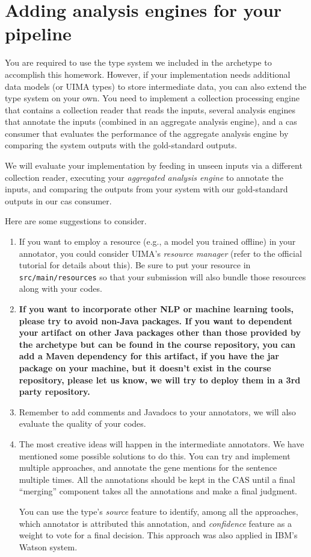 
\section{Adding analysis engines for your pipeline}

You are required to use the type system we included in the archetype to
accomplish this homework. However, if your implementation needs additional data
models (or UIMA types) to store intermediate data, you can also extend the type
system on your own. You need to implement a collection processing engine that
contains a collection reader that reads the inputs, several analysis engines
that annotate the inputs (combined in an aggregate analysis engine), and a cas
consumer that evaluates the performance of the aggregate analysis engine by
comparing the system outputs with the gold-standard outputs.

We will evaluate your implementation by feeding in unseen inputs via a different
collection reader, executing your \emph{aggregated analysis engine} to annotate
the inputs, and comparing the outputs from your system with our gold-standard
outputs in our cas consumer.

Here are some suggestions to consider.

\begin{enumerate}

\item If you want to employ a resource (e.g., a model you trained offline) in
your annotator, you could consider UIMA's \emph{resource manager} (refer to the
official tutorial for details about this).
Be sure to put your resource in \texttt{src/main/resources} so that your
submission will also bundle those resources along with your codes.

\item \textbf{If you want to incorporate other NLP or machine learning tools,
please try to avoid non-Java packages. If you want to dependent your artifact on
other Java packages other than those provided by the archetype but can be found
in the course repository, you can add a Maven dependency for this artifact, if
you have the jar package on your machine, but it doesn't exist in the course
repository, please let us know, we will try to deploy them in a 3rd party
repository.}

\item Remember to add comments and Javadocs to your annotators, we will also
evaluate the quality of your codes.

\item The most creative ideas will happen in the intermediate annotators. We
have mentioned some possible solutions to do this. You can try and implement
multiple approaches, and annotate the gene mentions for the sentence multiple
times. All the annotations should be kept in the CAS until a final ``merging''
component takes all the annotations and make a final judgment.

You can use the type's \emph{source} feature to identify, among all the
approaches, which annotator is attributed this annotation, and \emph{confidence}
feature as a weight to vote for a final decision. This approach was also applied
in IBM's Watson system.

\end{enumerate}
